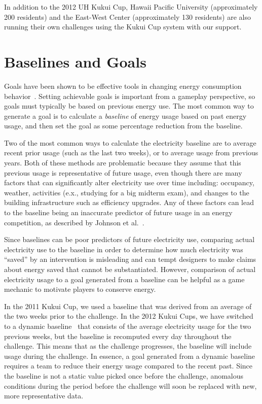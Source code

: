 \documentclass{sigchi}
\begin{document}
In addition to the 2012 UH Kukui Cup, Hawaii Pacific University (approximately 200 residents) and the East-West Center (approximately 130 residents) are also running their own challenges using the Kukui Cup system with our support.

\section{Baselines and Goals}
\label{sec:goals-baselines}

Goals have been shown to be effective tools in changing energy consumption behavior~\cite{Becker78, Houwelingen89}. Setting achievable goals is important from a gameplay perspective, so goals must typically be based on previous energy use. The most common way to generate a goal is to calculate a \emph{baseline} of energy usage based on past energy usage, and then set the goal as some percentage reduction from the baseline.

Two of the most common ways to calculate the electricity baseline are to average recent prior usage (such as the last two weeks), or to average usage from previous years. Both of these methods are problematic because they assume that this previous usage is representative of future usage, even though there are many factors that can significantly alter electricity use over time including: occupancy, weather, activities (e.x., studying for a big midterm exam), and changes to the building infrastructure such as efficiency upgrades. Any of these factors can lead to the baseline being an inaccurate predictor of future usage in an energy competition, as described by Johnson et al.~\cite{csdl2-12-08}.

Since baselines can be poor predictors of future electricity use, comparing actual electricity use to the baseline in order to determine how much electricity was ``saved'' by an intervention is misleading and can tempt designers to make claims about energy saved that cannot be substantiated. However, comparison of actual electricity usage to a goal generated from a baseline can be helpful as a game mechanic to motivate players to conserve energy.

In the 2011 Kukui Cup, we used a baseline that was derived from an average of the two weeks prior to the challenge. In the 2012 Kukui Cups, we have switched to a dynamic baseline~\cite{csdl2-12-08} that consists of the average electricity usage for the two previous weeks, but the baseline is recomputed every day throughout the challenge. This means that as the challenge progresses, the baseline will include usage during the challenge. In essence, a goal generated from a dynamic baseline requires a team to reduce their energy usage compared to the recent past. Since the baseline is not a static value picked once before the challenge, anomalous conditions during the period before the challenge will soon be replaced with new, more representative data.
\end{document}
